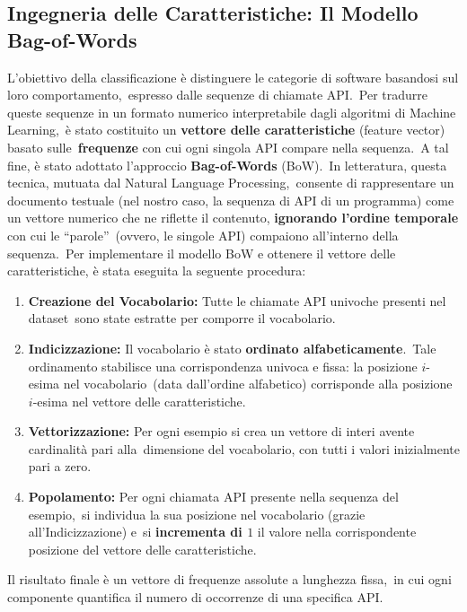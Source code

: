 \subsection{Ingegneria delle Caratteristiche: Il Modello Bag-of-Words}

L'obiettivo della classificazione è distinguere le categorie di software basandosi sul loro comportamento,\
espresso dalle sequenze di chiamate API.\
Per tradurre queste sequenze in un formato numerico interpretabile dagli algoritmi di Machine Learning,\
è stato costituito un \textbf{vettore delle caratteristiche} (feature vector) basato sulle\
\textbf{frequenze} con cui ogni singola API compare nella sequenza.\
A tal fine, è stato adottato l'approccio \textbf{Bag-of-Words} (BoW).\
In letteratura, questa tecnica, mutuata dal Natural Language Processing,\
consente di rappresentare un documento testuale (nel nostro caso, la sequenza di API di un programma)
come un vettore numerico che ne riflette il contenuto, \textbf{ignorando l'ordine temporale} con cui le ``parole''\
(ovvero, le singole API) compaiono all'interno della sequenza.\
Per implementare il modello BoW e ottenere il vettore delle caratteristiche, è stata eseguita la seguente procedura:

\begin{enumerate}
    \item \textbf{Creazione del Vocabolario:} Tutte le chiamate API univoche presenti nel dataset\
          sono state estratte per comporre il vocabolario.
    \item \textbf{Indicizzazione:} Il vocabolario è stato \textbf{ordinato alfabeticamente}.\
          Tale ordinamento stabilisce una corrispondenza univoca e fissa: la posizione $i$-esima nel vocabolario\
          (data dall'ordine alfabetico) corrisponde alla posizione $i$-esima nel vettore delle caratteristiche.
    \item \textbf{Vettorizzazione:} Per ogni esempio si crea un vettore di interi avente cardinalità pari alla\
          dimensione del vocabolario, con tutti i valori inizialmente pari a zero.
    \item \textbf{Popolamento:} Per ogni chiamata API presente nella sequenza del esempio,\
          si individua la sua posizione nel vocabolario (grazie all'Indicizzazione) e\
          si \textbf{incrementa di $1$} il valore nella corrispondente posizione del vettore delle caratteristiche.
\end{enumerate}

Il risultato finale è un vettore di frequenze assolute a lunghezza fissa,\
in cui ogni componente quantifica il numero di occorrenze di una specifica API.

